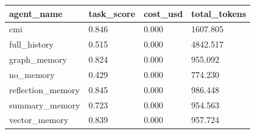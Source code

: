 \begin{tabular}{llll}
\toprule
agent\_name & task\_score & cost\_usd & total\_tokens \\
\midrule
cmi & 0.846 & 0.000 & 1607.805 \\
full\_history & 0.515 & 0.000 & 4842.517 \\
graph\_memory & 0.824 & 0.000 & 955.092 \\
no\_memory & 0.429 & 0.000 & 774.230 \\
reflection\_memory & 0.845 & 0.000 & 986.448 \\
summary\_memory & 0.723 & 0.000 & 954.563 \\
vector\_memory & 0.839 & 0.000 & 957.724 \\
\bottomrule
\end{tabular}
